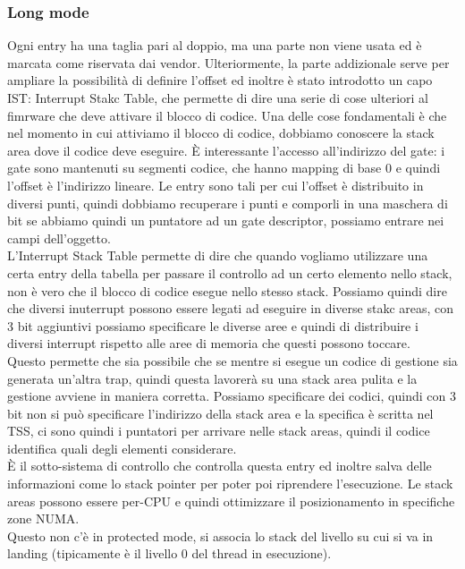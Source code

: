\documentclass[12pt, oneside]{extbook}
\begin{document}
\subsubsection{Long mode}
Ogni entry ha una taglia pari al doppio, ma una parte non viene usata ed è marcata come riservata dai vendor. Ulteriormente, la parte addizionale serve per ampliare la possibilità di definire l'offset ed inoltre è stato introdotto un capo IST: Interrupt Stakc Table, che permette di dire una serie di cose ulteriori al fimrware che deve attivare il blocco di codice. Una delle cose fondamentali è che nel momento in cui attiviamo il blocco di codice, dobbiamo conoscere la stack area dove il codice deve eseguire.
È interessante l'accesso all'indirizzo del gate: i gate sono mantenuti su segmenti codice, che hanno mapping di base 0 e quindi l'offset è l'indirizzo lineare. Le entry sono tali per cui l'offset è distribuito in diversi punti, quindi dobbiamo recuperare i punti e comporli in una maschera di bit
se abbiamo quindi un puntatore ad un gate descriptor, possiamo entrare nei campi dell'oggetto.\\L'Interrupt Stack Table permette di dire che quando vogliamo utilizzare una certa entry della tabella per passare il controllo ad un certo elemento nello stack, non è vero che il blocco di codice esegue nello stesso stack. Possiamo quindi dire che diversi inuterrupt possono essere legati ad eseguire in diverse stakc areas, con 3 bit aggiuntivi possiamo specificare le diverse aree e quindi di distribuire i diversi interrupt rispetto alle aree di memoria che questi possono toccare.\\Questo permette che sia possibile che se mentre si esegue un codice di gestione sia generata un'altra trap, quindi questa lavorerà su una stack area pulita e la gestione avviene in maniera corretta. Possiamo specificare dei codici, quindi con 3 bit non si può specificare l'indirizzo della stack area e la specifica è scritta nel TSS, ci sono quindi i puntatori per arrivare nelle stack areas, quindi il codice identifica quali degli elementi considerare.\\È il sotto-sistema di controllo che controlla questa entry ed inoltre salva delle informazioni come lo stack pointer per poter poi riprendere l'esecuzione. Le stack areas possono essere per-CPU e quindi ottimizzare il posizionamento in specifiche zone NUMA.\\Questo non c'è in protected mode, si associa lo stack del livello su cui si va in landing (tipicamente è il livello 0 del thread in esecuzione).
\end{document}
